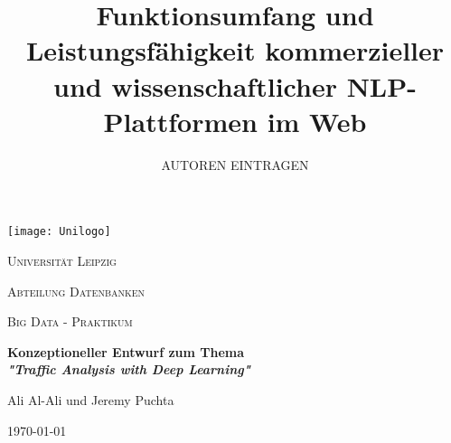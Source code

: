 \documentclass[12pt,a4paper, halfparskip]{scrartcl}
\title{Funktionsumfang und Leistungsfähigkeit kommerzieller und wissenschaftlicher NLP-Plattformen im Web}
\author{AUTOREN EINTRAGEN}
\begin{document}
\begin{titlepage}
	\centering
	\texttt{[image: Unilogo]}\par\vspace{1cm}
	{\scshape\LARGE Universität Leipzig \par}
	\vspace{0.5cm}
	{\scshape\Large Abteilung Datenbanken \par}
	\vspace{0.2cm}
	{\scshape\large Big Data - Praktikum \par}
	\vspace{1cm}
	{\huge\bfseries Konzeptioneller Entwurf zum Thema \\ \textit{"Traffic Analysis with Deep Learning"} \par}
	\vspace{1cm}
	{\Large Ali Al-Ali und Jeremy Puchta \par}

	\vfill
	
	{\large \today\par}
\end{titlepage}

\newpage

\thispagestyle{empty}
\tableofcontents
{}

\newpage
\pagestyle{empty}
\listoffigures
{}

\newpage
{}




\newpage
{}

\newpage
{}
\setcounter{page}{3}
\pagestyle{empty}

\renewcommand{\refname}{Literaturverzeichnis} 


\end{document}
